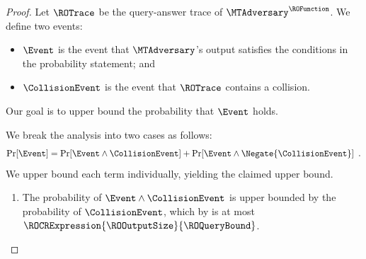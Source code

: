 \begin{proof}
Let $\ROTrace$ be the query-answer trace of $\MTAdversary^{\ROFunction}$. We define two events:
\begin{itemize}[noitemsep]
  \item $\Event$ is the event that $\MTAdversary$'s output satisfies the conditions in the probability statement; and
  \item $\CollisionEvent$ is the event that $\ROTrace$ contains a collision.
\end{itemize}
Our goal is to upper bound the probability that $\Event$ holds.

We break the analysis into two cases as follows:
\begin{equation*}
\Pr[\Event]
= \Pr[\Event \land \CollisionEvent]
+ \Pr[\Event \land \Negate{\CollisionEvent}]
\enspace.
\end{equation*}
We upper bound each term individually, yielding the claimed upper bound.
\begin{enumerate}

  \item The probability of $\Event \land \CollisionEvent$ is upper bounded by the probability of $\CollisionEvent$, which by  is at most $\ROCRExpression{\ROOutputSize}{\ROQueryBound}$.


\end{enumerate}
\end{proof}
